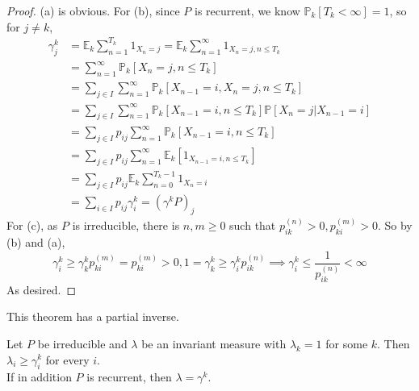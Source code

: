 \begin{proof}
    (a) is obvious.
    For (b), since $P$ is recurrent, we know $\mathbb P_k[T_k<\infty]=1$, so for $j\neq k$,
    \begin{align*}
        \gamma_j^k&=\mathbb E_k\sum_{n=1}^{T_k}1_{X_n=j}=\mathbb E_k\sum_{n=1}^\infty 1_{X_n=j,n\le T_k}\\
        &=\sum_{n=1}^\infty\mathbb P_k[X_n=j,n\le T_k]\\
        &=\sum_{j\in I}\sum_{n=1}^\infty\mathbb P_k[X_{n-1}=i,X_n=j,n\le T_k]\\
        &=\sum_{j\in I}\sum_{n=1}^\infty\mathbb P_k[X_{n-1}=i,n\le T_k]\mathbb P[X_n=j|X_{n-1}=i]\\
        &=\sum_{j\in I}p_{ij}\sum_{n=1}^\infty\mathbb P_k[X_{n-1}=i,n\le T_k]\\
        &=\sum_{j\in I}p_{ij}\sum_{n=1}^\infty\mathbb E_k[1_{X_{n-1}=i,n\le T_k}]\\
        &=\sum_{j\in I}p_{ij}\mathbb E_k\sum_{n=0}^{T_k-1}1_{X_n=i}\\
        &=\sum_{i\in I}p_{ij}\gamma_i^k=(\gamma^kP)_j
    \end{align*}
    For (c), as $P$ is irreducible, there is $n,m\ge 0$ such that $p_{ik}^{(n)}>0,p_{ki}^{(m)}>0$.
    So by (b) and (a),
    $$\gamma_i^k\ge\gamma_k^kp_{ki}^{(m)}=p_{ki}^{(m)}>0,1=\gamma_k^k\ge\gamma_i^kp_{ik}^{(n)}\implies \gamma_i^k\le\frac{1}{p_{ik}^{(n)}}<\infty$$
    As desired.
\end{proof}
This theorem has a partial inverse.
\begin{theorem}\label{inv_measure_exp}
    Let $P$ be irreducible and $\lambda$ be an invariant measure with $\lambda_k=1$ for some $k$.
    Then $\lambda_i\ge\gamma_i^k$ for every $i$.\\
    If in addition $P$ is recurrent, then $\lambda=\gamma^k$.
\end{theorem}

